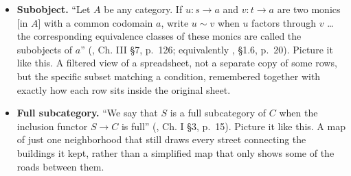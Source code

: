 \begin{itemize}
\item
  \textbf{Subobject.} ``Let \(A\) be any category. If \(u : s \to a\) and \(v : t \to a\) are two monics {[}in \(A\){]} with a common codomain \(a\), write \(u \sim v\) when \(u\) factors through \(v\) \ldots{} the corresponding equivalence classes of these monics are called the subobjects of \(a\)'' (\cite{MacLane1998}, Ch. III §7, p.~126; equivalently \cite{Pareigis1970}, §1.6, p.~20). Picture it like this. A filtered view of a spreadsheet, not a separate copy of some rows, but the specific subset matching a condition, remembered together with exactly how each row sits inside the original sheet.
\item
  \textbf{Full subcategory.} ``We say that \(S\) is a full subcategory of \(C\) when the inclusion functor \(S \to C\) is full'' (\cite{MacLane1998}, Ch. I §3, p.~15). Picture it like this. A map of just one neighborhood that still draws every street connecting the buildings it kept, rather than a simplified map that only shows some of the roads between them.
\end{itemize}
